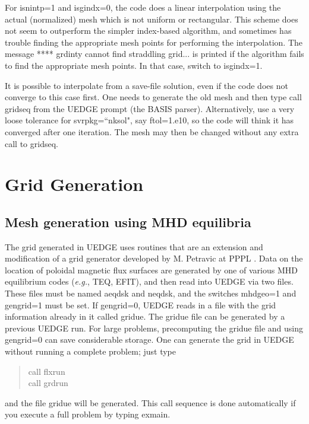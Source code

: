 \documentclass [12pt]{article}
\begin{document}
For isnintp=1 and isgindx=0, the code does a linear interpolation using the
actual (normalized) mesh which is not uniform or rectangular. This scheme does
not seem to outperform the simpler index-based algorithm, and sometimes has
trouble finding the appropriate mesh points for performing the interpolation.
The message {\sf ***** grdinty cannot find straddling grid...} is printed if
the algorithm fails to find the appropriate mesh points. In that case, switch
to {\sf isgindx}=1.

It is possible to interpolate from a save-file solution, even if the code does
not converge to this case first. One needs to generate the old mesh and then
type {\sf call gridseq} from the {\sf UEDGE} prompt (the {\sf BASIS} parser).
Alternatively, use a very loose tolerance for {\sf svrpkg=``nksol"}, say {\sf
ftol}=1.e10, so the code will think it has converged after one iteration. The
mesh may then be changed without any extra call to {\sf gridseq}.


\section{Grid Generation}

\subsection{Mesh generation using MHD equilibria}
The grid generated in {\sf UEDGE} uses routines that are an extension and
modification of a grid generator developed by M. Petravic at PPPL
\cite{petravic87}. Data on the location of poloidal magnetic flux surfaces are
generated by one of various MHD equilibrium codes ({\it e.g.}, {\sf TEQ,
  EFIT}), and then read into {\sf UEDGE} via two files. These files must be
named {\sf aeqdsk} and {\sf neqdsk}, and the switches {\sf mhdgeo}=1 and {\sf
  gengrid}=1 must be set.  If {\sf gengrid}=0, {\sf UEDGE} reads in a file
with the grid information already in it called {\sf gridue}. The {\sf gridue}
file can be generated by a previous {\sf UEDGE} run. For large problems,
precomputing the {\sf gridue} file and using {\sf gengrid}=0 can save
considerable storage. One can generate the grid in {\sf UEDGE} without running
a complete problem; just type
\begin{verse} \sf
      call flxrun \\
      call grdrun
\end{verse}
and the file {\sf gridue} will be generated. This call sequence is done
automatically if you execute a full problem by typing {\sf exmain}.
\end{document}
